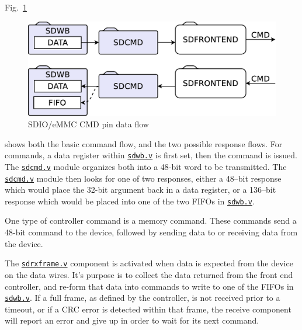 \documentclass{gqtekspec}
\newcommand{\zhref}[2]{\href{#1}{\textcolor{dkblue}{#2}}}
\begin{document}
Fig.~\ref{fig:sdcmdflow}
\begin{figure}\begin{center}
\includegraphics[width=5.0in]{gfx/sdiocmdflow.eps}
\caption{SDIO/eMMC CMD pin data flow}\label{fig:sdcmdflow}
\end{center}\end{figure}
shows both the basic command flow, and the two possible response flows.
For commands, a data register within \zhref{../rtl/sdwb.v}{\tt sdwb.v} is first set, then the
command is issued.  The \zhref{../rtl/sdcmd.v}{\tt sdcmd.v} module organizes both into a 48-bit
word to be transmitted.  The \zhref{../rtl/sdcmd.v}{\tt sdcmd.v} module then looks for one of
two responses, either a 48--bit response which would place the 32-bit
argument back in a data register, or a 136--bit response which would be
placed into one of the two FIFOs in \zhref{../rtl/sdwb.v}{\tt sdwb.v}.

One type of controller command is a memory command.  These commands send a
48-bit command to the device, followed by sending data to or receiving data
from the device.

The \zhref{../rtl/sdrxframe.v}{\tt sdrxframe.v} component is activated when data is expected from the
device on the data wires.  It's purpose is to collect the data returned from
the front end controller, and re-form that data into commands to write to
one of the FIFOs in \zhref{../rtl/sdwb.v}{\tt sdwb.v}.  If a full frame, as defined by the
controller, is not received prior to a timeout, or if a CRC error is detected
within that frame, the receive component will report an error and give up
in order to wait for its next command.
\end{document}
